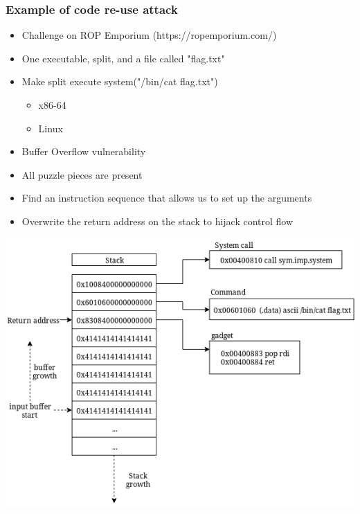 \begin{frame}
	\frametitle{Example of code re-use attack}

	\begin{itemize}
		\item Challenge on ROP Emporium (https://ropemporium.com/)
		\item One executable, split, and a file called "flag.txt"
		\item Make split execute system("/bin/cat flag.txt")
			\begin{itemize}
				\item x86-64
				\item Linux
			\end{itemize}
	\end{itemize}

	\vspace{0.5cm}

	\begin{itemize}
		\item	Buffer Overflow vulnerability
		\item All puzzle pieces are present
		\item	Find an instruction sequence that allows us to set up the arguments
		\item	Overwrite the return address on the stack to hijack control flow
	\end{itemize}

\end{frame}

\begin{frame}
	\includegraphics[width=\textwidth]{../background/software-diversity/figures/after-payload}
\end{frame}

